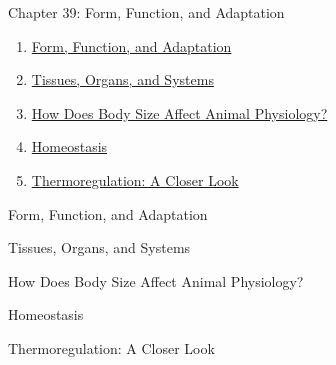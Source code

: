 \documentclass[12pt,letterpaper]{article}
\begin{document}
\begin{chapbox}{Chapter 39: Form, Function, and Adaptation}
    \begin{enumerate}
        \item \hyperlink{39.1}{Form, Function, and Adaptation}
        \item \hyperlink{39.2}{Tissues, Organs, and Systems}
        \item \hyperlink{39.3}{How Does Body Size Affect Animal Physiology?}
        \item \hyperlink{39.4}{Homeostasis}
        \item \hyperlink{39.5}{Thermoregulation: A Closer Look}
    \end{enumerate}
\end{chapbox}
\hypertarget{39.1}{}
\begin{secbox}{Form, Function, and Adaptation}{

}\end{secbox}
\hypertarget{39.2}{}
\begin{secbox}{Tissues, Organs, and Systems}{

}\end{secbox}
\hypertarget{39.3}{}
\begin{secbox}{How Does Body Size Affect Animal Physiology?}{

}\end{secbox}
\hypertarget{39.4}{}
\begin{secbox}{Homeostasis}{

}\end{secbox}
\hypertarget{39.5}{}
\begin{secbox}{Thermoregulation: A Closer Look}{

}\end{secbox}
\clearpage
\end{document}
